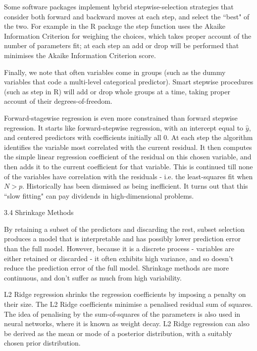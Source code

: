 Some software packages implement hybrid stepwise-selection strategies that consider both forward and backward moves at each step, and select the ``best" of the two. For example in the R package the step function uses the Akaike Information Criterion for weighing the choices, which takes proper account of the number of parameters fit; at each step an add or drop will be performed that minimises the Akaike Information Criterion score.

Finally, we note that often variables come in groups (such as the dummy variables that code a multi-level categorical predictor). Smart stepwise procedures (such as step in R) will add or drop whole groups at a time, taking proper account of their degrees-of-freedom.

Forward-stagewise regression is even more constrained than forward stepwise regression. It starts like forward-stepwise regression, with an intercept equal to $\hat{y}$, and centered predictors with coefficients initially all 0. At each step the algorithm identifies the variable most correlated with the current residual. It then computes the simple linear regression coefficient of the residual on this chosen variable, and then adds it to the current coefficient for that variable. This is continued till none of the variables have correlation with the residuals - i.e. the least-squares fit when $N > p$. Historically has been dismissed as being inefficient. It turns out that this ``slow fitting" can pay dividends in high-dimensional problems.

3.4 Shrinkage Methods

By retaining a subset of the predictors and discarding the rest, subset selection produces a model that is interpretable and has possibly lower prediction error than the full model. However, because it is a discrete process - variables are either retained or discarded - it often exhibits high variance, and so doesn't reduce the prediction error of the full model. Shrinkage methods are more continuous, and don't suffer as much from high variability.

L2 Ridge regression shrinks the regression coefficients by imposing a penalty on their size. The L2 Ridge coefficients minimise a penalised residual sum of squares. The idea of penalising by the sum-of-squares of the parameters is also used in neural networks, where it is known as weight decay. L2 Ridge regression can also be derived as the mean or mode of a posterior distribution, with a suitably chosen prior distribution.

